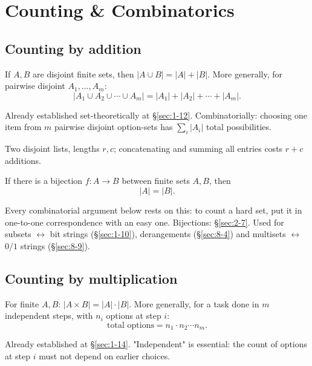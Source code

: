 \documentclass[11pt]{article}
\begin{document}
\newpage
\section{Counting \& Combinatorics}

\subsection{Counting by addition}
\label{sec:8-1}

\begin{theorem}
If $A,B$ are disjoint finite sets, then $|A\cup B|=|A|+|B|$. More generally, for pairwise disjoint $A_1,\dots,A_m$:
\[
|A_1\cup A_2\cup\cdots\cup A_m| = |A_1|+|A_2|+\cdots+|A_m|.
\]
\end{theorem}
\begin{note}
Already established set-theoretically at \S\ref{sec:1-12}. Combinatorially: choosing one item from $m$ pairwise disjoint option-sets has $\sum_i|A_i|$ total possibilities.
\end{note}

\begin{example}
Two disjoint lists, lengths $r,c$; concatenating and summing all entries costs $r+c$ additions.
\end{example}

\bigskip
\begin{theorem}
\label{thm:bijectionrule}
If there is a bijection $f: A\to B$ between finite sets $A,B$, then
\[
|A| = |B|.
\]
\end{theorem}
\begin{note}
Every combinatorial argument below rests on this: to count a hard set, put it in one-to-one correspondence with an easy one. Bijections: \S\ref{sec:2-7}. Used for subsets $\leftrightarrow$ bit strings (\S\ref{sec:1-10}), derangements (\S\ref{sec:8-4}) and multisets $\leftrightarrow$ $0/1$ strings (\S\ref{sec:8-9}).
\end{note}

\subsection{Counting by multiplication}
\label{sec:8-2}

\begin{theorem}
For finite $A,B$: $|A\times B| = |A|\cdot|B|$. More generally, for a task done in $m$ independent steps, with $n_i$ options at step $i$:
\[
\text{total options} = n_1\cdot n_2\cdots n_m.
\]
\end{theorem}
\begin{note}
Already established at \S\ref{sec:1-14}. "Independent" is essential: the count of options at step $i$ must not depend on earlier choices.
\end{note}
\end{document}
